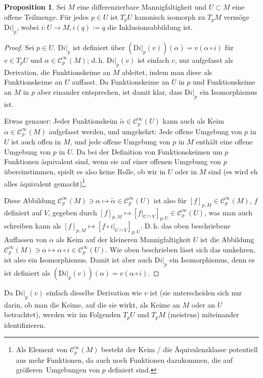 \documentclass[a4paper]{scrreprt}
\numberwithin{equation}{chapter}
\newcommand{\DD}{\mathrm{D}}
\newcommand{\sC}{\mathcal{C}^{\infty}}
\theoremstyle{definition}
\newtheorem{prop}[defn]{Proposition}
\begin{document}
\begin{prop}
	Sei $M$ eine differenzierbare Mannigfaltigkeit und $U\subset M$ eine offene Teilmenge. Für jedes $p\in U$ ist $T_pU$ kanonisch isomorph zu $T_pM$ vermöge $\left.\DD i\right|_p$, wobei $i\colon U \to M, i(q) := q$ die Inklusionsabbildung ist.

	\begin{proof}
		Sei $p \in U$. $\left.\DD i\right|_p$ ist definiert über $\left(\left.\DD i\right|_p(v)\right)(\alpha) = v(\alpha\circ i)$ für $v \in T_pU$ und $\alpha \in \sC_p(M)$; d.\,h. $\left.\DD i\right|_p(v)$ ist einfach $v$, nur aufgefasst als Derivation, die Funktionskeime an $M$ ableitet, indem man diese als Funktionskeime an $U$ auffasst. Da Funktionskeime an $U$ in $p$ und Funktionskeime an $M$ in $p$ aber einander entsprechen, ist damit klar, dass $\left.\DD i\right|_p$ ein Isomorphismus ist.

		Etwas genauer: Jeder Funktionskeim $\tilde\alpha \in \sC_p(U)$ kann auch als Keim $\alpha \in \sC_p(M)$ aufgefasst werden, und umgekehrt: Jede offene Umgebung von $p$ in $U$ ist auch offen in $M$, und jede offene Umgebung von $p$ in $M$ enthält eine offene Umgebung von $p$ in $U$. Da bei der Definition von Funktionskeimen um $p$ Funktionen äquivalent sind, wenn sie auf einer offenen Umgebung von $p$ übereinstimmen, spielt es also keine Rolle, ob wir in $U$ oder in $M$ sind (\glqq es wird eh alles äquivalent gemacht\grqq)\footnote{
			Als Element von $\sC_p(M)$ besteht der Keim / die Äquivalenzklasse potentiell aus mehr Funktionen, da auch noch Funktionen dazukommen, die auf \glqq größeren\grqq\ Umgebungen von $p$ definiert sind.
		}.

		Diese Abbildung $\sC_p(M) \ni \alpha \mapsto \tilde\alpha \in \sC_p(U)$ ist also für $[f]_{p,M} \in \sC_p(M)$, $f$ definiert auf $V$, gegeben durch $[f]_{p,M} \mapsto \left[\left.f\right|_{U\cap V}\right]_{p,U} \in \sC_p(U)$, was man auch schreiben kann als $[f]_{p,M} \mapsto \left[\left.f\circ i\right|_{U\cap V}\right]_{p,U}$. D.\,h. das oben beschriebene Auffassen von $\alpha$ als Keim auf der kleineren Mannigfaltigkeit $U$ ist die Abbildung $\sC_p(M) \ni \alpha \mapsto \alpha\circ i \in \sC_p(U)$. Wie oben beschrieben lässt sich das umkehren, ist also ein Isomorphismus. Damit ist aber auch $\left.\DD i\right|_p$ ein Isomorphismus, denn es ist definiert als $\left(\left.\DD i\right|_p(v)\right)(\alpha) = v(\alpha\circ i)$.
	\end{proof}
\end{prop}

Da $\left.\DD i\right|_p(v)$ einfach dieselbe Derivation wie $v$ ist (sie unterscheiden sich nur darin, ob man die Keime, auf die sie wirkt, als Keime an $M$ oder an $U$ betrachtet), werden wir im Folgenden $T_pU$ und $T_pM$ (meistens) miteinander identifizieren.
\end{document}
